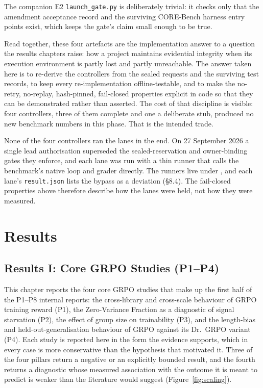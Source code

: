 \documentclass[12pt,a4paper]{report}
\newcommand{\longtok}[1]{\texttt{\seqsplit{#1}}}
\begin{document}
The companion E2 \texttt{launch\_gate.py} is deliberately trivial: it
checks only that the amendment acceptance record and the surviving
CORE-Bench harness entry points exist, which keeps the gate's claim
small enough to be true.

Read together, these four artefacts are the implementation answer to a
question the results chapters raise: how a project maintains evidential
integrity when its execution environment is partly lost and partly
unreachable. The answer taken here is to re-derive the controllers from
the sealed requests and the surviving test records, to keep every
re-implementation offline-testable, and to make the no-retry, no-replay,
hash-pinned, fail-closed properties explicit in code so that they can be
demonstrated rather than asserted. The cost of that discipline is
visible: four controllers, three of them complete and one a deliberate
stub, produced no new benchmark numbers in this phase. That is the
intended trade.

None of the four controllers ran the lanes in the end. On 27 September
2026 a single lead authorisation superseded the sealed-reservation and
owner-binding gates they enforce, and each lane was run with a thin
runner that calls the benchmark's native loop and grader directly. The
runners live under
\longtok{outputs/finish\_\allowbreak{}pending\_\allowbreak{}2026-09-27/\textless{}lane\textgreater{}/code/},
and each lane's \texttt{result.json} lists the bypass as a deviation
(§8.4). The fail-closed properties above therefore describe how the
lanes were held, not how they were measured.



\part{Results}


\chapter{Results I: Core GRPO Studies
(P1--P4)}\label{results-i-core-grpo-studies-p1p4}

This chapter reports the four core GRPO studies that make up the first
half of the P1--P8 internal reports: the cross-library and cross-scale
behaviour of GRPO training reward (P1), the Zero-Variance Fraction as a
diagnostic of signal starvation (P2), the effect of group size on
trainability (P3), and the length-bias and held-out-generalisation
behaviour of GRPO against its Dr.~GRPO variant (P4). Each study is
reported here in the form the evidence supports, which in every case is
more conservative than the hypothesis that motivated it. Three of the
four pillars return a negative or an explicitly bounded result, and the
fourth returns a diagnostic whose measured association with the outcome
it is meant to predict is weaker than the literature would suggest (Figure~\ref{fig:scaling}).
\end{document}
